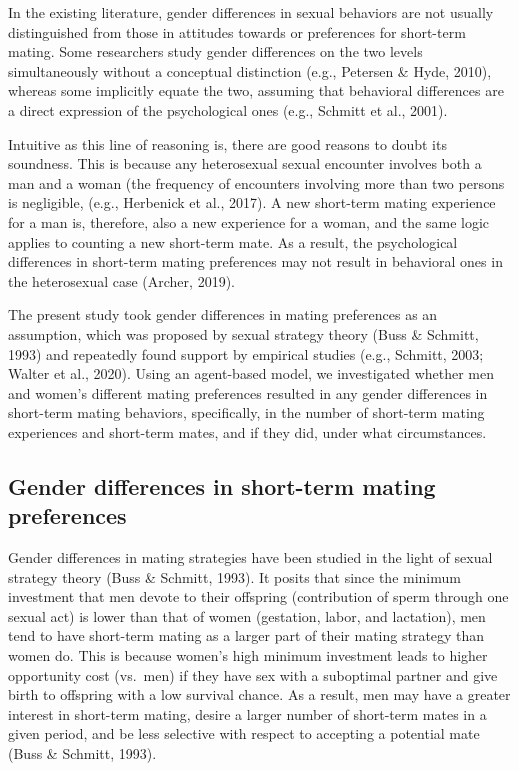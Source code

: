 \documentclass[
  11pt,
]{article}
\begin{document}
In the existing literature, gender differences in sexual behaviors are
not usually distinguished from those in attitudes towards or preferences
for short-term mating. Some researchers study gender differences on the
two levels simultaneously without a conceptual distinction (e.g.,
Petersen \& Hyde, 2010), whereas some implicitly equate the two,
assuming that behavioral differences are a direct expression of the
psychological ones (e.g., Schmitt et al., 2001).

Intuitive as this line of reasoning is, there are good reasons to doubt
its soundness. This is because any heterosexual sexual encounter
involves both a man and a woman (the frequency of encounters involving
more than two persons is negligible, (e.g., Herbenick et al., 2017). A
new short-term mating experience for a man is, therefore, also a new
experience for a woman, and the same logic applies to counting a new
short-term mate. As a result, the psychological differences in
short-term mating preferences may not result in behavioral ones in the
heterosexual case (Archer, 2019).

The present study took gender differences in mating preferences as an
assumption, which was proposed by sexual strategy theory (Buss \&
Schmitt, 1993) and repeatedly found support by empirical studies (e.g.,
Schmitt, 2003; Walter et al., 2020). Using an agent-based model, we
investigated whether men and women's different mating preferences
resulted in any gender differences in short-term mating behaviors,
specifically, in the number of short-term mating experiences and
short-term mates, and if they did, under what circumstances.

\hypertarget{gender-differences-in-short-term-mating-preferences}{%
\subsection{Gender differences in short-term mating
preferences}\label{gender-differences-in-short-term-mating-preferences}}

Gender differences in mating strategies have been studied in the light
of sexual strategy theory (Buss \& Schmitt, 1993). It posits that since
the minimum investment that men devote to their offspring (contribution
of sperm through one sexual act) is lower than that of women (gestation,
labor, and lactation), men tend to have short-term mating as a larger
part of their mating strategy than women do. This is because women's
high minimum investment leads to higher opportunity cost (vs.~men) if
they have sex with a suboptimal partner and give birth to offspring with
a low survival chance. As a result, men may have a greater interest in
short-term mating, desire a larger number of short-term mates in a given
period, and be less selective with respect to accepting a potential mate
(Buss \& Schmitt, 1993).
\end{document}
